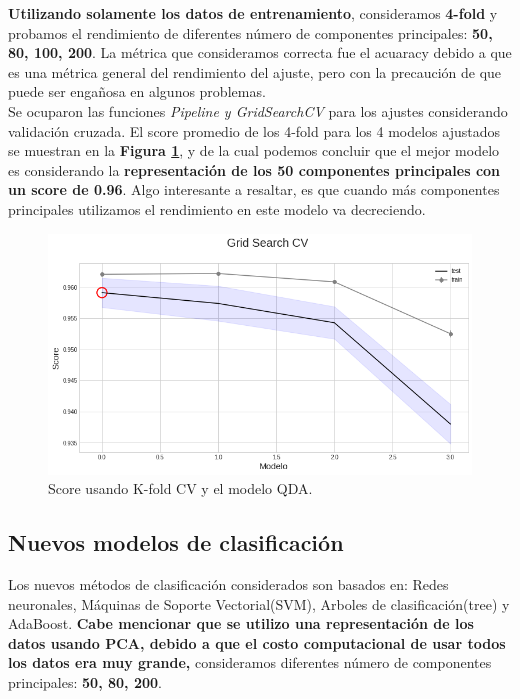 \documentclass[paper=letter, fontsize=11pt]{scrartcl}
\numberwithin{equation}{section} %
\numberwithin{figure}{section} %
\numberwithin{table}{section} %
\begin{document}
\textbf{Utilizando solamente los datos de entrenamiento}, consideramos \textbf{4-fold} y probamos el rendimiento de diferentes número de componentes principales: \textbf{50, 80, 100, 200}. La métrica que consideramos correcta fue el acuaracy debido a que es una métrica general del rendimiento del ajuste, pero con la precaución de que puede ser engañosa en algunos problemas.\\

Se ocuparon las funciones \textit{Pipeline y GridSearchCV} para los ajustes considerando validación cruzada. El score promedio de los 4-fold para los 4 modelos ajustados se muestran en la \textbf{Figura \ref{qda_best_model}}, y de la cual podemos concluir que el mejor modelo es considerando la \textbf{representación de los 50 componentes principales con un score de 0.96}. Algo interesante a resaltar, es que cuando más componentes principales utilizamos el rendimiento en este modelo va decreciendo.

\begin{figure}[H] 
\centering
\includegraphics[scale=0.5]{figure/best_model_update.png}\caption{Score usando K-fold CV y el modelo QDA.}\label{qda_best_model}
\end{figure}

\subsection{Nuevos modelos de clasificación}
Los nuevos métodos de clasificación considerados son basados en: Redes neuronales, Máquinas de Soporte Vectorial(SVM), Arboles de clasificación(tree) y AdaBoost. \textbf{Cabe mencionar que se utilizo una representación de los datos usando PCA, debido a que el costo computacional de usar todos los datos era muy grande,} consideramos diferentes número de componentes principales: \textbf{50, 80, 200}.\\
\end{document}
